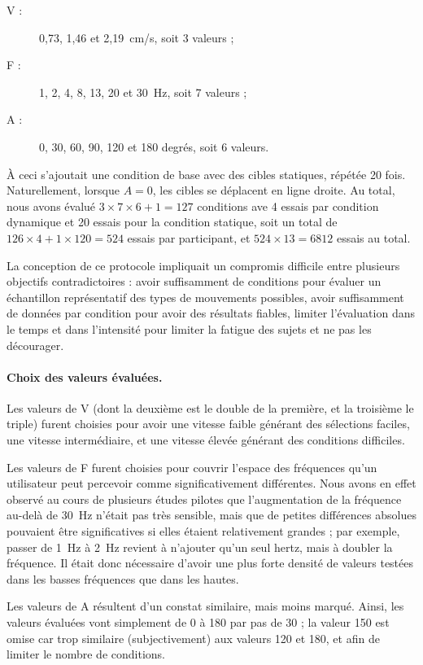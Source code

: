 	\begin{description}
		\item[V :] 0,73, 1,46 et 2,19~cm/s, soit 3 valeurs ;
		\item[F :] 1, 2, 4, 8, 13, 20 et 30~Hz, soit 7 valeurs ;
		\item[A :] 0, 30, 60, 90, 120 et 180 degrés, soit 6 valeurs.
	\end{description}
	
	À ceci s'ajoutait une condition de base avec des cibles statiques, répétée 20 fois. Naturellement, lorsque $A = 0$, les cibles se déplacent en ligne droite. Au total, nous avons évalué $3 \times 7 \times 6 + 1 = 127$ conditions ave 4 essais par condition dynamique et 20 essais pour la condition statique, soit un total de $126 \times 4 + 1 \times 120 = 524$ essais par participant, et $524 \times 13 = 6812$ essais au total.
	
	La conception de ce protocole impliquait un compromis difficile entre plusieurs objectifs contradictoires : avoir suffisamment de conditions pour évaluer un échantillon représentatif des types de mouvements possibles, avoir suffisamment de données par condition pour avoir des résultats fiables, limiter l'évaluation dans le temps et dans l'intensité pour limiter la fatigue des sujets et ne pas les décourager.
	
	\paragraph{Choix des valeurs évaluées.}
	Les valeurs de V (dont la deuxième est le double de la première, et la troisième le triple) furent choisies pour avoir une vitesse faible générant des sélections faciles, une vitesse intermédiaire, et une vitesse élevée générant des conditions difficiles.
	
	Les valeurs de F furent choisies pour couvrir l'espace des fréquences qu'un utilisateur peut percevoir comme significativement différentes. Nous avons en effet observé au cours de plusieurs études pilotes que l'augmentation de la fréquence au-delà de 30~Hz n'était pas très sensible, mais que de petites différences absolues pouvaient être significatives si elles étaient relativement grandes ; par exemple, passer de 1~Hz à 2~Hz revient à n'ajouter qu'un seul hertz, mais à doubler la fréquence. Il était donc nécessaire d'avoir une plus forte densité de valeurs testées dans les basses fréquences que dans les hautes.
	
	Les valeurs de A résultent d'un constat similaire, mais moins marqué. Ainsi, les valeurs évaluées vont simplement de 0\textdegree{} à 180\textdegree{} par pas de 30\textdegree{} ; la valeur 150\textdegree{} est omise car trop similaire (subjectivement) aux valeurs 120\textdegree{} et 180\textdegree{}, et afin de limiter le nombre de conditions.

